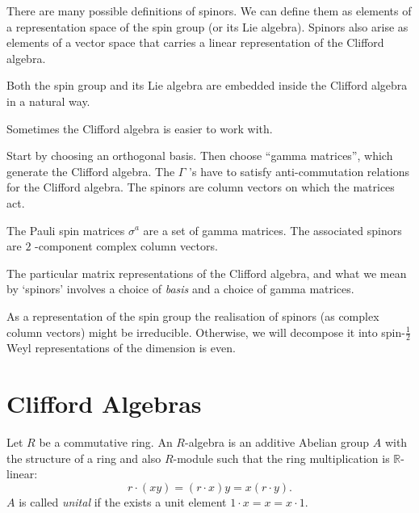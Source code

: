 There are many possible definitions of spinors. We can define them as elements of a representation space of the spin group (or its Lie algebra).
Spinors also arise as elements of a vector space that carries a linear representation of the Clifford algebra.

Both the spin group and its Lie algebra are embedded inside the Clifford algebra in a natural way.

Sometimes the Clifford algebra is easier to work with.

Start by choosing an orthogonal basis. Then choose ``gamma matrices'', which generate the Clifford algebra.
The $\Gamma$ 's have to satisfy anti-commutation relations for the Clifford algebra. The spinors are column vectors on which the matrices act.

\begin{example}[Euclidean 3 $d$]
  The Pauli spin matrices $\sigma^{a}$  are a set of gamma matrices. The associated spinors are $2$ -component complex column vectors.
\end{example}

The particular matrix representations of the Clifford algebra, and what we mean by `spinors' involves a choice of \emph{basis} and a choice of gamma matrices.

As a representation of the spin group the realisation of spinors (as complex column vectors) might be irreducible.
Otherwise, we will decompose it into spin-$\frac{1}{2}$  Weyl representations of the dimension is even.

\section{Clifford Algebras}%
\label{sec:clifford_algebras}

\begin{definition}[$R$-algebra]
  Let $R$ be a commutative ring. An $R$-algebra is an additive Abelian group $A$ with the structure of a ring and also $R$-module such that the ring multiplication is $\mathbb{R}$-linear:
  \begin{equation}
    r \cdot (xy) = (r \cdot x) y = x (r \cdot y).
  \end{equation}
  $A$ is called \emph{unital} if the exists a unit element $1 \cdot x = x = x \cdot 1$.
\end{definition}

